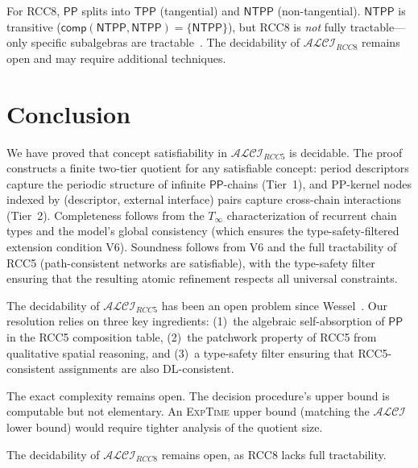 \documentclass[a4paper,11pt]{article}
\theoremstyle{definition}
\newcommand{\ALCI}{\ensuremath{\mathcal{ALCI}}}
\newcommand{\ALCIRCC}[1]{\ensuremath{\mathcal{ALCI}_{\mathit{RCC#1}}}}
\newcommand{\PP}{\ensuremath{\mathsf{PP}}}
\newcommand{\comp}{\ensuremath{\mathsf{comp}}}
\newcommand{\EXPTIME}{\textsc{ExpTime}}
\begin{document}
For RCC8, $\PP$ splits into $\mathsf{TPP}$ (tangential) and
$\mathsf{NTPP}$ (non-tangential).  $\mathsf{NTPP}$ is transitive
($\comp(\mathsf{NTPP}, \mathsf{NTPP}) = \{\mathsf{NTPP}\}$), but
RCC8 is \emph{not} fully tractable---only specific subalgebras are
tractable~\cite{Renz1999}.  The decidability of $\ALCIRCC{8}$
remains open and may require additional techniques.


\section{Conclusion}\label{sec:conclusion}

We have proved that concept satisfiability in $\ALCIRCC{5}$ is
decidable.  The proof constructs a finite two-tier quotient for any
satisfiable concept: period descriptors capture the periodic structure
of infinite $\PP$-chains (Tier~1), and PP-kernel nodes indexed by
(descriptor, external interface) pairs capture cross-chain interactions
(Tier~2).  Completeness
follows from the $T_\infty$ characterization of recurrent chain types
and the model's global consistency (which ensures the type-safety-filtered
extension condition V6).  Soundness follows from V6 and the full
tractability of RCC5 (path-consistent networks are satisfiable), with
the type-safety filter ensuring that the resulting atomic refinement
respects all universal constraints.

The decidability of $\ALCIRCC{5}$ has been an open problem since
Wessel~\cite{Wessel2003}.  Our resolution relies on three key
ingredients: (1)~the algebraic self-absorption of $\PP$ in the RCC5
composition table, (2)~the patchwork property of RCC5 from
qualitative spatial reasoning, and (3)~a type-safety filter ensuring
that RCC5-consistent assignments are also DL-consistent.

The exact complexity remains open.  The decision procedure's upper
bound is computable but not elementary.  An \EXPTIME{} upper bound
(matching the $\ALCI$ lower bound) would require tighter analysis of
the quotient size.

The decidability of $\ALCIRCC{8}$ remains open, as RCC8 lacks full
tractability.
\end{document}
